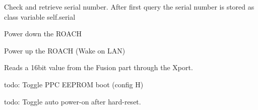 \documentclass[letterpaper,10pt,english]{sphinxmanual}
\begin{document}
\begin{fulllineitems}
\begin{fulllineitems}
\end{fulllineitems}



\begin{fulllineitems}
\label{index:xport.Xport.get_serial}
Check and retrieve serial number. After first query the serial
number is stored as class variable self.serial

\end{fulllineitems}



\begin{fulllineitems}
\label{index:xport.Xport.power_down}
Power down the ROACH

\end{fulllineitems}



\begin{fulllineitems}
\label{index:xport.Xport.power_up}
Power up the ROACH (Wake on LAN)

\end{fulllineitems}



\begin{fulllineitems}
\label{index:xport.Xport.read}
Reads a 16bit value from the Fusion part through the Xport.

\end{fulllineitems}



\begin{fulllineitems}
\label{index:xport.Xport.toggle_config_h}
todo: Toggle PPC EEPROM boot (config H)

\end{fulllineitems}



\begin{fulllineitems}
\label{index:xport.Xport.toggle_power_on_reset}
todo: Toggle auto power-on after hard-reset.


\end{fulllineitems}
\end{fulllineitems}
\end{document}
